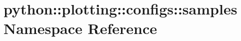 \hypertarget{namespacepython_1_1plotting_1_1configs_1_1samples}{
\section{python::plotting::configs::samples Namespace Reference}
\label{namespacepython_1_1plotting_1_1configs_1_1samples}
}
